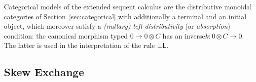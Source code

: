 \documentclass[submission,copyright,creativecommons]{eptcs}
\theoremstyle{definition}
\newcommand{\andr}{\land \mathsf{R}}
\newcommand{\orrone}{\lor \mathsf{R}_{1}}
\newcommand{\ot}{\otimes}
\newcommand{\RI}{\mathsf{RI}}
\newcommand{\F}{\mathsf{F}}
\newcommand{\topr}{\top \mathsf{R}}
\newcommand{\botl}{\bot \mathsf{L}}
\newcommand\cheng[1]{\mbox{}
{\marginpar{\color{blue}CSW}}
{\sf\noindent\color{blue}#1}}%
\begin{document}

Categorical models of the extended sequent calculus are the distributive monoidal categories of Section~\ref{sec:categorical} with additionally a terminal and an initial object, which moreover satisfy a \emph{(nullary) left-distributivity} (or \emph{absorption}) condition: the canonical morphism typed $0 \to 0 \ot C$ has an inverse\linebreak $k : 0 \ot C \to 0$. The latter is used in the interpretation of the rule $\botl$.

\subsection{Skew Exchange}\label{subsec:Ex}
\end{document}
